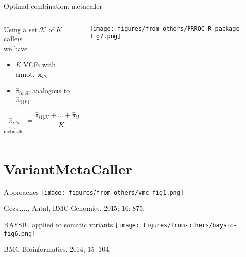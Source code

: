 \documentclass{beamer} %
\begin{document}
\begin{frame}{Optimal combination: metacaller}
\begin{columns}[t]
\begin{column}{0.45\textwidth}
Using a set \(\mathcal{K}\) of \(K\) callers \\
we have
\begin{itemize}
\item \(K\) VCFs with annot.~\(\mathbf{x}_{i\mathcal{K}}\)
\item \(\hat{\pi}_{ik | \mathcal{K}}\) analogous to \(\hat{\pi}_{i | \{k\}}\)
\end{itemize}
\bigskip

\[\underbrace{\hat{\pi}_{i | \mathcal{K}}}_{\text{metacaller}} = \frac{\hat{\pi}_{i1 | \mathcal{K}} + ... + \hat{\pi}_{iK | \mathcal{K}}}{K}\]
\end{column}
\begin{column}{0.6\textwidth}

\texttt{[image: figures/from-others/PRROC-R-package-fig7.png]}
\end{column}
\end{columns}

\end{frame}

\section{VariantMetaCaller}

\begin{frame}{Approaches}
\texttt{[image: figures/from-others/vmc-fig1.png]}
\bigskip

{\footnotesize G\'{e}zsi,..., Antal, BMC Genomics. 2015; 16: 875.}
\end{frame}

\begin{frame}{BAYSIC applied to somatic variants}
\texttt{[image: figures/from-others/baysic-fig6.png]}
\bigskip

{\footnotesize BMC Bioinformatics. 2014; 15: 104.}
\end{frame}
\end{document}
